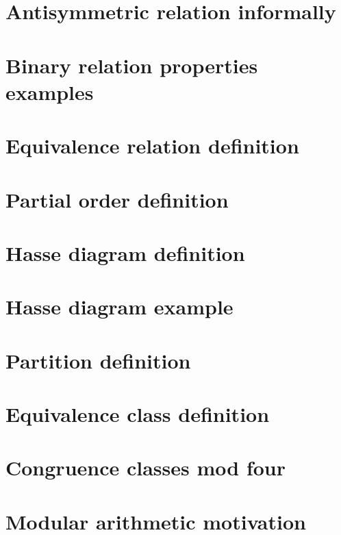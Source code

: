 \section*{Antisymmetric relation informally}

\vfill
\section*{Binary relation properties examples}

\vfill
\section*{Equivalence relation definition}

\vfill
\section*{Partial order definition}

\vfill
\section*{Hasse diagram definition}

\vfill
\section*{Hasse diagram example}

\vfill
\section*{Partition definition}

\vfill
\section*{Equivalence class definition}

\vfill
\section*{Congruence classes mod four}

\vfill
\section*{Modular arithmetic motivation}

\vfill
